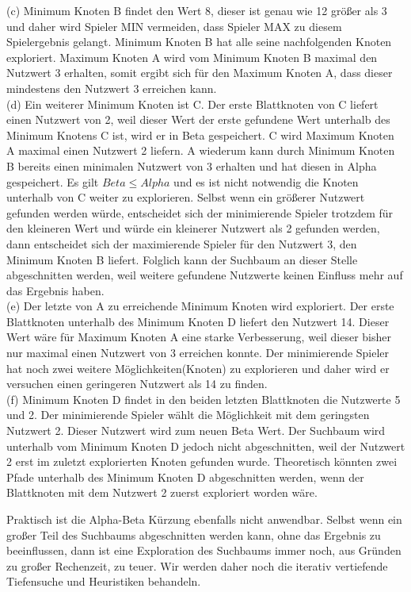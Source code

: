 (c) Minimum Knoten B findet den Wert 8, dieser ist genau wie 12 größer als 3 und daher wird Spieler MIN vermeiden, dass Spieler MAX zu diesem Spielergebnis gelangt. Minimum Knoten B hat alle seine nachfolgenden Knoten exploriert. Maximum Knoten A wird vom Minimum Knoten B maximal den Nutzwert 3 erhalten, somit ergibt sich für den Maximum Knoten A, dass dieser mindestens den Nutzwert 3 erreichen kann. \\

(d) Ein weiterer Minimum Knoten ist C. Der erste Blattknoten von C liefert einen Nutzwert von 2, weil dieser Wert der erste gefundene Wert unterhalb des Minimum Knotens C ist, wird er in Beta gespeichert. C wird Maximum Knoten A maximal einen Nutzwert 2 liefern. A wiederum kann durch Minimum Knoten B bereits einen minimalen Nutzwert von 3 erhalten und hat diesen in Alpha gespeichert. Es gilt $Beta \leq Alpha$ und es ist nicht notwendig die Knoten unterhalb von C weiter zu explorieren. Selbst wenn ein größerer Nutzwert gefunden werden würde, entscheidet sich der minimierende Spieler trotzdem für den kleineren Wert und würde ein kleinerer Nutzwert als 2 gefunden werden, dann entscheidet sich der maximierende Spieler für den Nutzwert 3, den Minimum Knoten B liefert. Folglich kann der Suchbaum an dieser Stelle abgeschnitten werden, weil weitere gefundene Nutzwerte keinen Einfluss mehr auf das Ergebnis haben. \\

(e) Der letzte von A zu erreichende Minimum Knoten wird exploriert. Der erste Blattknoten unterhalb des Minimum Knoten D liefert den Nutzwert 14. Dieser Wert wäre für Maximum Knoten A eine starke Verbesserung, weil dieser bisher nur maximal einen Nutzwert von 3 erreichen konnte. Der minimierende Spieler hat noch zwei weitere Möglichkeiten(Knoten) zu explorieren und daher wird er versuchen einen geringeren Nutzwert als 14 zu finden. \\

(f) Minimum Knoten D findet in den beiden letzten Blattknoten die Nutzwerte 5 und 2. Der minimierende Spieler wählt die Möglichkeit mit dem geringsten Nutzwert 2. Dieser Nutzwert wird zum neuen Beta Wert. Der Suchbaum wird unterhalb vom Minimum Knoten D jedoch nicht abgeschnitten, weil der Nutzwert 2 erst im zuletzt explorierten Knoten gefunden wurde. Theoretisch könnten zwei Pfade unterhalb des Minimum Knoten D abgeschnitten werden, wenn der Blattknoten mit dem Nutzwert 2 zuerst exploriert worden wäre.

Praktisch ist die Alpha-Beta Kürzung ebenfalls nicht anwendbar. Selbst wenn ein großer Teil des Suchbaums abgeschnitten werden kann, ohne das Ergebnis zu beeinflussen, dann ist eine Exploration des Suchbaums immer noch, aus Gründen zu großer Rechenzeit, zu teuer. Wir werden daher noch die iterativ vertiefende Tiefensuche und Heuristiken behandeln. 

